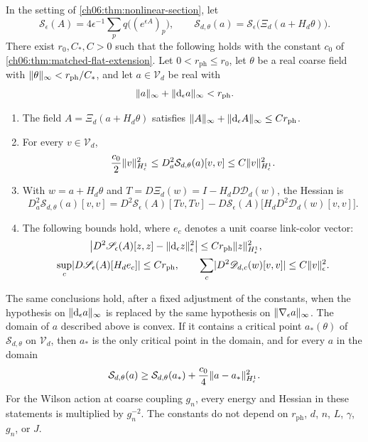 \begin{theorem}\label{ch06:thm:constrained-convexity}
In the setting of \cref{ch06:thm:nonlinear-section}, let
\[
 \mathscr S_\epsilon(A)=4\epsilon^{-1}\sum_pq\bigl((e^{\epsilon A})_p\bigr),\qquad\mathcal S_{d,\theta}(a)=\mathscr S_\epsilon\bigl(\Xi_d(a+H_d\theta)\bigr).
\]
There exist $r_0,C_*,C>0$ such that the following holds with the constant $c_0$ of \cref{ch06:thm:matched-flat-extension}. Let $0<r_{\mathrm{ph}}\le r_0$, let $\theta$ be a real coarse field with $\lVert \theta\rVert_\infty<r_{\mathrm{ph}}/C_*$, and let $a\in\mathcal V_d$ be real with
\[
 \lVert a\rVert_\infty+\lVert \mathrm d_\epsilon a\rVert_\infty<r_{\mathrm{ph}}.
\]
\begin{enumerate}
\item The field $A=\Xi_d(a+H_d\theta)$ satisfies $\lVert A\rVert_\infty+\lVert \mathrm d_\epsilon A\rVert_\infty\le Cr_{\mathrm{ph}}$.
\item For every $v\in\mathcal V_d$,
\[
 \frac{c_0}2\lVert v\rVert_{H^1_\epsilon}^2\le D_a^2\mathcal S_{d,\theta}(a)[v,v]\le C\lVert v\rVert_{H^1_\epsilon}^2.
\]
\item With $w=a+H_d\theta$ and $T=D\Xi_d(w)=I-H_dD\mathscr D_d(w)$, the Hessian is
\[
 D_a^2\mathcal S_{d,\theta}(a)[v,v]=D^2\mathscr S_\epsilon(A)[Tv,Tv]-D\mathscr S_\epsilon(A)\bigl[H_dD^2\mathscr D_d(w)[v,v]\bigr].
\]
\item The following bounds hold, where $e_c$ denotes a unit coarse link-color vector:
\[
 \begin{aligned}
 \bigl\lvert D^2\mathscr S_\epsilon(A)[z,z]-\lVert \mathrm d_\epsilon z\rVert_\epsilon^2\bigr\rvert&\le Cr_{\mathrm{ph}}\lVert z\rVert_{H^1_\epsilon}^2,\\
 \sup_c\lvert D\mathscr S_\epsilon(A)[H_de_c]\rvert\le Cr_{\mathrm{ph}},\qquad&\sum_c\lvert D^2\mathscr D_{d,c}(w)[v,v]\rvert\le C\lVert v\rVert_\epsilon^2.
 \end{aligned}
\]
\end{enumerate}
The same conclusions hold, after a fixed adjustment of the constants, when the hypothesis on $\lVert \mathrm d_\epsilon a\rVert_\infty$ is replaced by the same hypothesis on $\lVert \nabla_\epsilon a\rVert_\infty$. The domain of $a$ described above is convex. If it contains a critical point $a_*(\theta)$ of $\mathcal S_{d,\theta}$ on $\mathcal V_d$, then $a_*$ is the only critical point in the domain, and for every $a$ in the domain
\[
 \mathcal S_{d,\theta}(a)\ge\mathcal S_{d,\theta}(a_*)+\frac{c_0}4\lVert a-a_*\rVert_{H^1_\epsilon}^2.
\]
For the Wilson action at coarse coupling $g_n$, every energy and Hessian in these statements is multiplied by $g_n^{-2}$. The constants do not depend on $r_{\mathrm{ph}}$, $d$, $n$, $L$, $\gamma$, $g_n$, or $J$.
\end{theorem}


